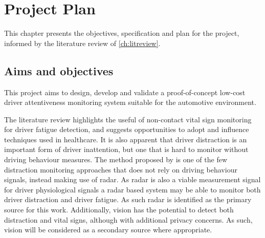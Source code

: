 \documentclass[11pt, parskip=half*,twoside=false]{scrbook}
\begin{document}
{%
%
%
%

\chapter{Project Plan} \label{ch:plan}
This chapter presents the objectives, specification and plan for the project, informed by the literature review of \cref{ch:litreview}.

\section{Aims and objectives}
This project aims to design, develop and validate a proof-of-concept low-cost driver attentiveness monitoring system suitable for the automotive environment.

The literature review highlights the useful of non-contact vital sign monitoring for driver fatigue detection, and suggests opportunities to adopt and influence techniques used in healthcare. It is also apparent that driver distraction is an important form of driver inattention, but one that is hard to monitor without driving behaviour measures. The method proposed by \citet{dingInattentiveDrivingBehavior2019} is one of the few distraction monitoring approaches that does not rely on driving behaviour signals, instead making use of radar. As radar is also a viable measurement signal for driver physiological signals a radar based system may be able to monitor both driver distraction and driver fatigue.  As such radar is identified as the primary source for this work. Additionally, vision has the potential to detect both distraction and vital signs, although with additional privacy concerns. As such, vision will be considered as a secondary source where appropriate.

}
\end{document}
